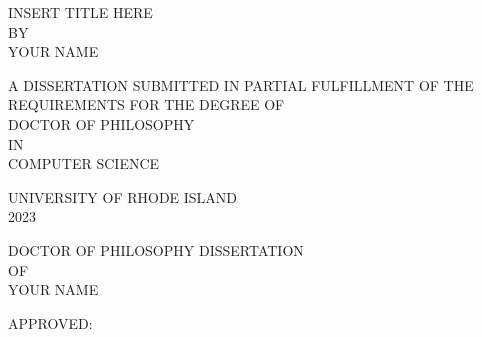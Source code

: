 %
%



\thispagestyle{empty}%
\begin{center}{
  \MakeUppercase{insert title here} \\  %
  BY \\
  \MakeUppercase{your name}}   %
\end{center}
\vfill
\begin{center}

\end{center}
\vfill
\begin{center}{
  A \MakeUppercase{Dissertation} %
  SUBMITTED IN PARTIAL FULFILLMENT OF THE\\
  REQUIREMENTS FOR THE DEGREE OF\\
  DOCTOR OF PHILOSOPHY\\  %
  IN\\
  \MakeUppercase{COMPUTER SCIENCE}}   %
\end{center}
\vfill
\begin{center}

\end{center}
\vfill
\begin{center}
  UNIVERSITY OF RHODE ISLAND\\
  2023    %
\end{center}
\newpage



\setcounter{page}{1}
\thispagestyle{empty}%
\begin{center}
  DOCTOR OF PHILOSOPHY DISSERTATION\\   %
  OF\\
  \MakeUppercase{your name}   %
\end{center}
\vfill
  APPROVED:\\\vspace{-1.0em}\\
\null\hfill


